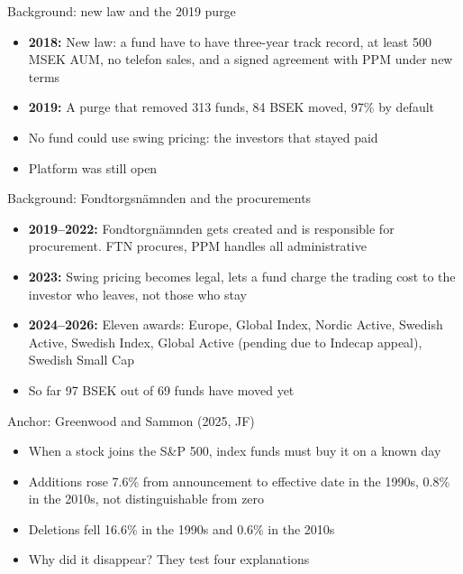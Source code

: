 \documentclass[aspectratio=169]{beamer}
\begin{document}
\begin{frame}{Background: new law and the 2019 purge}
  \begin{itemize}
    \item \textbf{2018:} New law: a fund have to have three-year track record,
      at least 500 MSEK AUM, no telefon sales, and a signed agreement with PPM
      under new terms
    \item \textbf{2019:} A purge that removed 313 funds, 84 BSEK moved, 97\% by default
    \item No fund could use swing pricing: the investors that stayed paid
    \item Platform was still open
  \end{itemize}
\end{frame}

\begin{frame}{Background: Fondtorgsnämnden and the procurements}
  \begin{itemize}
    \item \textbf{2019--2022:} Fondtorgnämnden gets created and is responsible for
      procurement. FTN procures, PPM handles all administrative
    \item \textbf{2023:} Swing pricing becomes legal, lets a fund charge the trading
      cost to the investor who leaves, not those who stay
    \item \textbf{2024--2026:} Eleven awards: Europe, Global Index, Nordic Active,
      Swedish Active, Swedish Index, Global Active (pending due to Indecap appeal),
      Swedish Small Cap
    \item So far 97 BSEK out of 69 funds have moved yet
  \end{itemize}
\end{frame}

\begin{frame}[label=anchor]{Anchor: Greenwood and Sammon (2025, JF)}
  \begin{itemize}
    \item When a stock joins the S\&P 500, index funds must buy it on a known day
    \item Additions rose 7.6\% from announcement to effective date in the 1990s,
      0.8\% in the 2010s, not distinguishable from zero
    \item Deletions fell 16.6\% in the 1990s and 0.6\% in the 2010s
    \item Why did it disappear? They test four explanations
  \end{itemize}
\end{frame}
\end{document}
